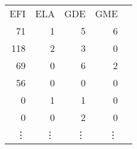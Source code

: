 \begin{tabular}{rrrrr}
EFI & ELA & GDE & GME  \\
 71 &   1 &   5 &   6    \\
118 &   2 &   3 &   0     \\
 69 &   0 &   6 &   2    \\
 56 &   0 &   0 &   0   \\
  0 &   1 &   1 &   0  \\
  0 &   0 &   2 &   0 \\
\vdots & \vdots & \vdots & \vdots  
\end{tabular}
%

